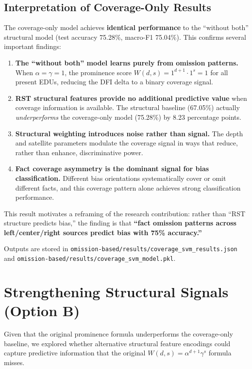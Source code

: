 \documentclass[12pt,a4paper]{article}
\begin{document}
\subsection{Interpretation of Coverage-Only Results}

The coverage-only model achieves \textbf{identical performance} to the ``without both'' structural model
(test accuracy 75.28\%, macro-F1 75.04\%). This confirms several important findings:

\begin{enumerate}
\item \textbf{The ``without both'' model learns purely from omission patterns.}
      When $\alpha=\gamma=1$, the prominence score $W(d,s) = 1^{d+1} \cdot 1^s = 1$ for all present EDUs,
      reducing the DFI delta to a binary coverage signal.

\item \textbf{RST structural features provide no additional predictive value} when coverage information is available.
      The structural baseline (67.05\%) actually \textit{underperforms} the coverage-only model (75.28\%)
      by 8.23 percentage points.

\item \textbf{Structural weighting introduces noise rather than signal.}
      The depth and satellite parameters modulate the coverage signal in ways that reduce,
      rather than enhance, discriminative power.

\item \textbf{Fact coverage asymmetry is the dominant signal for bias classification.}
      Different bias orientations systematically cover or omit different facts,
      and this coverage pattern alone achieves strong classification performance.
\end{enumerate}

This result motivates a reframing of the research contribution:
rather than ``RST structure predicts bias,'' the finding is that
\textbf{``fact omission patterns across left/center/right sources predict bias with 75\% accuracy.''}

Outputs are stored in \texttt{omission-based/results/coverage\_svm\_results.json}
and \texttt{omission-based/results/coverage\_svm\_model.pkl}.

\section{Strengthening Structural Signals (Option B)}

Given that the original prominence formula underperforms the coverage-only baseline,
we explored whether alternative structural feature encodings could capture predictive
information that the original $W(d,s) = \alpha^{d+1} \gamma^s$ formula misses.
\end{document}
